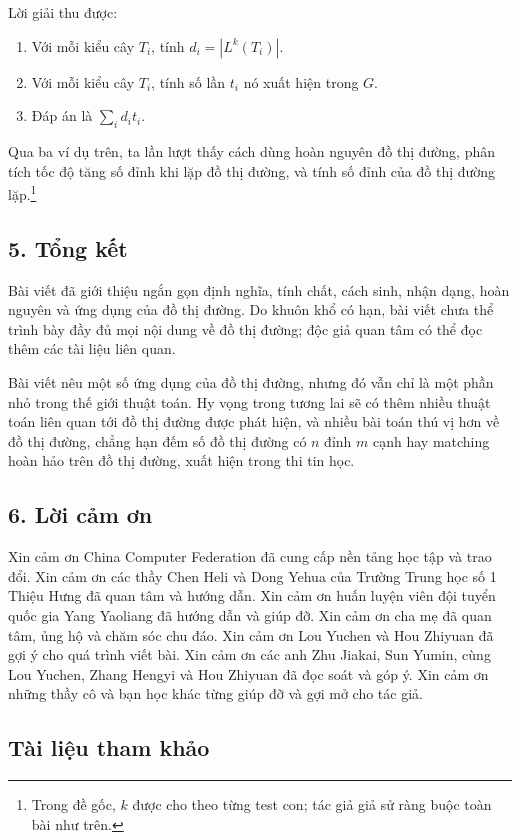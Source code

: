 \documentclass[11pt]{article}
\begin{document}
Lời giải thu được:
\begin{enumerate}
  \item Với mỗi kiểu cây \(T_i\), tính \(d_i=|L^k(T_i)|\).
  \item Với mỗi kiểu cây \(T_i\), tính số lần \(t_i\) nó xuất hiện trong \(G\).
  \item Đáp án là \(\sum_i d_i t_i\).
\end{enumerate}

Qua ba ví dụ trên, ta lần lượt thấy cách dùng hoàn nguyên đồ thị đường, phân
tích tốc độ tăng số đỉnh khi lặp đồ thị đường, và tính số đỉnh của đồ thị đường
lặp.\footnote{Trong đề gốc, \(k\) được cho theo từng test con; tác giả giả sử
ràng buộc toàn bài như trên.}

\subsection*{5. Tổng kết}

Bài viết đã giới thiệu ngắn gọn định nghĩa, tính chất, cách sinh, nhận dạng,
hoàn nguyên và ứng dụng của đồ thị đường. Do khuôn khổ có hạn, bài viết chưa
thể trình bày đầy đủ mọi nội dung về đồ thị đường; độc giả quan tâm có thể đọc
thêm các tài liệu liên quan.

Bài viết nêu một số ứng dụng của đồ thị đường, nhưng đó vẫn chỉ là một phần
nhỏ trong thế giới thuật toán. Hy vọng trong tương lai sẽ có thêm nhiều thuật
toán liên quan tới đồ thị đường được phát hiện, và nhiều bài toán thú vị hơn về
đồ thị đường, chẳng hạn đếm số đồ thị đường có \(n\) đỉnh \(m\) cạnh hay
matching hoàn hảo trên đồ thị đường, xuất hiện trong thi tin học.

\subsection*{6. Lời cảm ơn}

Xin cảm ơn China Computer Federation đã cung cấp nền tảng học tập và trao đổi.
Xin cảm ơn các thầy Chen Heli và Dong Yehua của Trường Trung học số 1 Thiệu
Hưng đã quan tâm và hướng dẫn. Xin cảm ơn huấn luyện viên đội tuyển quốc gia
Yang Yaoliang đã hướng dẫn và giúp đỡ. Xin cảm ơn cha mẹ đã quan tâm, ủng hộ
và chăm sóc chu đáo. Xin cảm ơn Lou Yuchen và Hou Zhiyuan đã gợi ý cho quá
trình viết bài. Xin cảm ơn các anh Zhu Jiakai, Sun Yumin, cùng Lou Yuchen,
Zhang Hengyi và Hou Zhiyuan đã đọc soát và góp ý. Xin cảm ơn những thầy cô và
bạn học khác từng giúp đỡ và gợi mở cho tác giả.

\subsection*{Tài liệu tham khảo}
\end{document}
